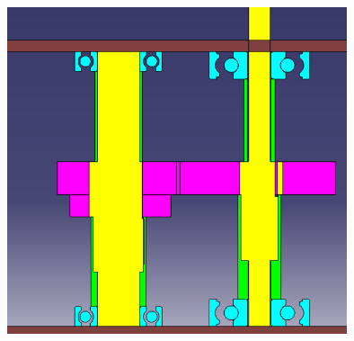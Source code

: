 \documentclass{config}
\begin{document}
\begin{spacing}{1.2}
\begin{center}
\includegraphics[width=0.75\textwidth]{vue_coupe_BE_E_I.PNG}
\end{center}
\end{spacing}
\end{document}
